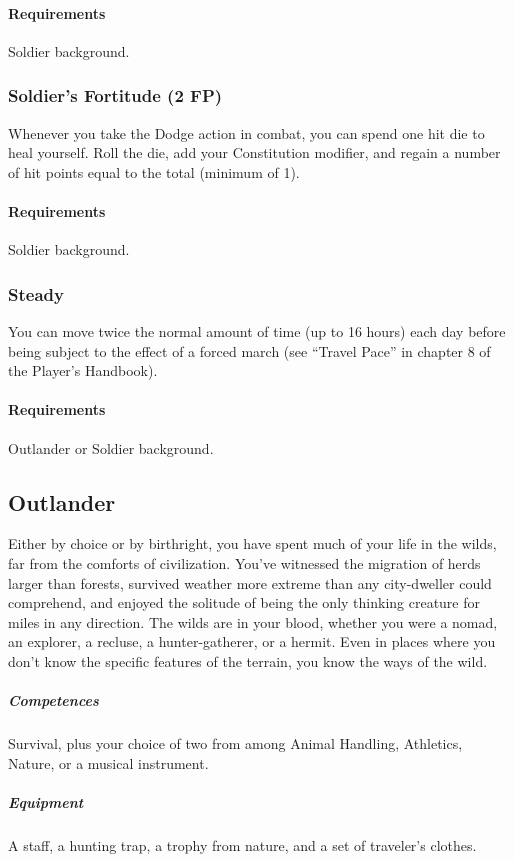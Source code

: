             \paragraph{Requirements} Soldier background.
        \subsubsection{Soldier's Fortitude (2 FP)} \label{feat::soldiersfortitude}
            Whenever you take the Dodge action in combat, you can spend one hit die to heal yourself.
            Roll the die, add your Constitution modifier, and regain a number of hit points equal to the total (minimum of 1).
            \paragraph{Requirements} Soldier background.
        \subsubsection{Steady} \label{feat::steady}
            You can move twice the normal amount of time (up to 16 hours) each day before being subject to the effect of a forced march (see ``Travel Pace'' in chapter 8 of the Player's Handbook).
            \paragraph{Requirements} Outlander or Soldier background.
\subsection*{Outlander} \label{ssec::outlander}
    Either by choice or by birthright, you have spent much of your life in the wilds, far from the comforts of civilization.
    You've witnessed the migration of herds larger than forests, survived weather more extreme than any city-dweller could comprehend, and enjoyed the solitude of being the only thinking creature for miles in any direction.
    The wilds are in your blood, whether you were a nomad, an explorer, a recluse, a hunter-gatherer, or a hermit.
    Even in places where you don't know the specific features of the terrain, you know the ways of the wild.

    \subparagraph{Competences} Survival, plus your choice of two from among Animal Handling, Athletics, Nature, or a musical instrument.

    \subparagraph{Equipment} A staff, a hunting trap, a trophy from nature, and a set of traveler's clothes.

